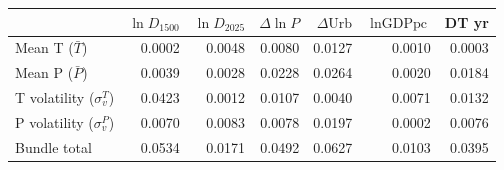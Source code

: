 \begin{tabular}{lrrrrrr}
\toprule
 & $\ln\!D_{1500}$ & $\ln\!D_{2025}$ & $\Delta\!\ln\!P$ & $\Delta\text{Urb}$ & $\ln\!\text{GDPpc}$ & DT yr \\
\midrule
Mean T ($\bar T$) & 0.0002 & 0.0048 & 0.0080 & 0.0127 & 0.0010 & 0.0003 \\
Mean P ($\bar P$) & 0.0039 & 0.0028 & 0.0228 & 0.0264 & 0.0020 & 0.0184 \\
T volatility ($\sigma_v^T$) & 0.0423 & 0.0012 & 0.0107 & 0.0040 & 0.0071 & 0.0132 \\
P volatility ($\sigma_v^P$) & 0.0070 & 0.0083 & 0.0078 & 0.0197 & 0.0002 & 0.0076 \\
\midrule
Bundle total & 0.0534 & 0.0171 & 0.0492 & 0.0627 & 0.0103 & 0.0395 \\
\bottomrule
\end{tabular}
